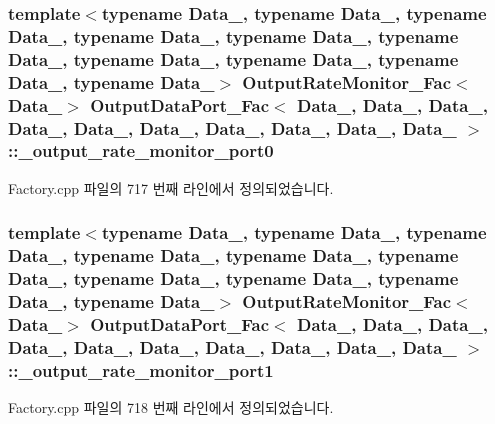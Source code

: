 \subsubsection[{\texorpdfstring{\+\_\+output\+\_\+rate\+\_\+monitor\+\_\+port0}{_output_rate_monitor_port0}}]{\setlength{\rightskip}{0pt plus 5cm}template$<$typename Data\+\_, typename Data\+\_, typename Data\+\_, typename Data\+\_, typename Data\+\_, typename Data\+\_, typename Data\+\_, typename Data\+\_, typename Data\+\_, typename Data\+\_$>$ {\bf Output\+Rate\+Monitor\+\_\+\+Fac}$<$Data\+\_$>$ {\bf Output\+Data\+Port\+\_\+\+Fac}$<$ Data\+\_, Data\+\_, Data\+\_, Data\+\_, Data\+\_, Data\+\_, Data\+\_, Data\+\_, Data\+\_, Data\+\_ $>$\+::\+\_\+output\+\_\+rate\+\_\+monitor\+\_\+port0\hspace{0.3cm}{\ttfamily [private]}}\hypertarget{classOutputDataPort__Fac_a85d54bb4480401d8d5d78281c39d8ac7}{}\label{classOutputDataPort__Fac_a85d54bb4480401d8d5d78281c39d8ac7}


Factory.\+cpp 파일의 717 번째 라인에서 정의되었습니다.

\subsubsection[{\texorpdfstring{\+\_\+output\+\_\+rate\+\_\+monitor\+\_\+port1}{_output_rate_monitor_port1}}]{\setlength{\rightskip}{0pt plus 5cm}template$<$typename Data\+\_, typename Data\+\_, typename Data\+\_, typename Data\+\_, typename Data\+\_, typename Data\+\_, typename Data\+\_, typename Data\+\_, typename Data\+\_, typename Data\+\_$>$ {\bf Output\+Rate\+Monitor\+\_\+\+Fac}$<$Data\+\_$>$ {\bf Output\+Data\+Port\+\_\+\+Fac}$<$ Data\+\_, Data\+\_, Data\+\_, Data\+\_, Data\+\_, Data\+\_, Data\+\_, Data\+\_, Data\+\_, Data\+\_ $>$\+::\+\_\+output\+\_\+rate\+\_\+monitor\+\_\+port1\hspace{0.3cm}{\ttfamily [private]}}\hypertarget{classOutputDataPort__Fac_a79a7fb9b739aeab490bc361abc38b193}{}\label{classOutputDataPort__Fac_a79a7fb9b739aeab490bc361abc38b193}


Factory.\+cpp 파일의 718 번째 라인에서 정의되었습니다.

